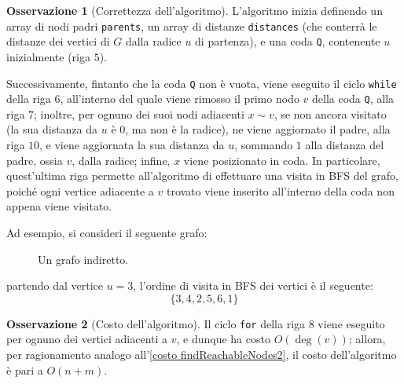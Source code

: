 \documentclass[14pt]{extreport}
\theoremstyle{definition}
\theoremstyle{definition}
\newtheorem{remark}{Osservazione}[subsection]
\begin{document}
\begin{remark}[Correttezza dell'algoritmo]
    L'algoritmo inizia definendo un array di nodi padri \texttt{parents}, un array di distanze \texttt{distances} (che conterrà le distanze dei vertici di $G$ dalla radice $u$ di partenza), e una coda \texttt{Q}, contenente $u$ inizialmente (riga $5$).

    Successivamente, fintanto che la coda \texttt{Q} non è vuota, viene eseguito il ciclo \texttt{while} della riga $6$, all'interno del quale viene rimosso il primo nodo $v$ della coda \texttt{Q}, alla riga $7$; inoltre, per ognuno dei suoi nodi adiacenti $x \sim v$, se non ancora visitato (la sua distanza da $u$ è $0$, ma non è la radice), ne viene aggiornato il padre, alla riga $10$, e viene aggiornata la sua distanza da $u$, sommando $1$ alla distanza del padre, ossia $v$, dalla radice; infine, $x$ viene posizionato in coda. In particolare, quest'ultima riga permette all'algoritmo di effettuare una visita in BFS del grafo, poiché ogni vertice adiacente a $v$ trovato viene inserito all'interno della coda non appena viene visitato.

    Ad esempio, si consideri il seguente grafo:

    \begin{figure}[H]
        \centering
        \caption{Un grafo indiretto.}
    \end{figure}

    partendo dal vertice $u = 3$, l'ordine di visita in BFS dei vertici è il seguente: $$\{3, 4, 2, 5, 6, 1\}$$

\end{remark}

\begin{remark}[Costo dell'algoritmo]
    Il ciclo \texttt{for} della riga $8$ viene eseguito per ognuno dei vertici adiacenti a $v$, e dunque ha costo $O(\deg(v))$; allora, per ragionamento analogo all'\cref{costo findReachableNodes2}, il costo dell'algoritmo è pari a $O(n +m)$.
\end{remark}
\end{document}
